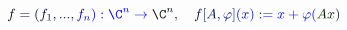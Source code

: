 \documentclass[12pt]{article}
\begin{document}
\makeatletter
\renewcommand*{\@textcolor}[3]{%
  \protect\leavevmode
  \begingroup
    \color#1{#2}#3%
  \endgroup
}
\makeatother
\begin{displaymath}
\mathcolor[RGB]{0,0,15}{f} \mathcolor[RGB]{0,0,30}{=} \mathcolor[RGB]{0,0,45}{(} \mathcolor[RGB]{0,0,60}{f} _ { \mathcolor[RGB]{0,0,75}{1} } \mathcolor[RGB]{0,0,90}{,} \mathcolor[RGB]{0,0,105}{.} \mathcolor[RGB]{0,0,120}{.} \mathcolor[RGB]{0,0,135}{.} \mathcolor[RGB]{0,0,150}{,} \mathcolor[RGB]{0,0,165}{f} _ { \mathcolor[RGB]{0,0,180}{n} } \mathcolor[RGB]{0,0,195}{)} \mathcolor[RGB]{0,0,210}{:} \mathcolor[RGB]{0,0,225}{\C} ^ { \mathcolor[RGB]{0,0,240}{n} } \mathcolor[RGB]{0,0,255}{\to} \mathcolor[RGB]{0,15,0}{\C} ^ { \mathcolor[RGB]{0,15,15}{n} } \mathcolor[RGB]{0,15,30}{,} \quad \mathcolor[RGB]{0,15,45}{f} \mathcolor[RGB]{0,15,60}{[} \mathcolor[RGB]{0,15,75}{A} \mathcolor[RGB]{0,15,90}{,} \mathcolor[RGB]{0,15,105}{\varphi} \mathcolor[RGB]{0,15,120}{]} \mathcolor[RGB]{0,15,135}{(} \mathcolor[RGB]{0,15,150}{x} \mathcolor[RGB]{0,15,165}{)} \mathcolor[RGB]{0,15,180}{:} \mathcolor[RGB]{0,15,195}{=} \mathcolor[RGB]{0,15,210}{x} \mathcolor[RGB]{0,15,225}{+} \mathcolor[RGB]{0,15,240}{\varphi} \mathcolor[RGB]{0,15,255}{(} \mathcolor[RGB]{0,30,0}{A} \mathcolor[RGB]{0,30,15}{x} \mathcolor[RGB]{0,30,30}{)}
\end{displaymath}
\end{document}
